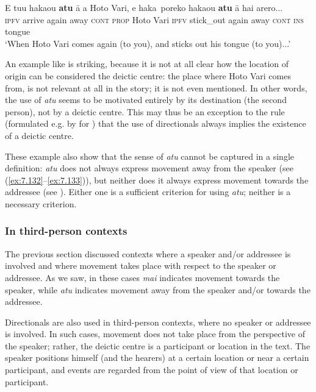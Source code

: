 \ea\label{ex:7.133}
\gll E tu{\ꞌ}u haka{\ꞌ}ou \textbf{atu} {\ꞌ}ā a Hoto Vari,  e haka~poreko haka{\ꞌ}ou \textbf{atu} {\ꞌ}ā hai {\ꞌ}arero...\\
\textsc{ipfv} arrive again away \textsc{cont} \textsc{prop} Hoto Vari  \textsc{ipfv} stick\_out again away \textsc{cont} \textsc{ins} tongue\\

\glt
‘When Hoto Vari comes again (to you), and sticks out his tongue (to you)...’ \textstyleExampleref{[R304.020]} 
\z

An example like  is striking, because it is not at all clear how the location of origin can be considered the deictic centre: the place where Hoto Vari comes from, is not relevant at all in the story; it is not even mentioned. In other words, the use of \textit{atu} seems to be motivated entirely by its destination (the second person), not by a deictic centre. This may thus be an exception to the rule (formulated e.g. by \citealt[285]{Hooper2002} for ) that the use of directionals always implies the existence of a deictic centre.

These example also show that the sense of \textit{atu} cannot be captured in a single definition: \textit{atu} does not always express movement away from the speaker (see (\ref{ex:7.132}–\ref{ex:7.133})), but neither does it always express movement towards the addressee (see ). Either one is a sufficient criterion for using \textit{atu}; neither is a necessary criterion.

\subsubsection{In third-person contexts}\label{sec:7.5.1.2}

The previous section discussed contexts where a speaker and/or addressee is involved and where movement takes place with respect to the speaker or addressee. As we saw, in these cases \textit{mai} indicates movement towards the speaker, while \textit{atu} indicates movement away from the speaker and/or towards the addressee.

Directionals are also used in third-person contexts, where no speaker or addressee is involved. In such cases, movement does not take place from the perspective of the speaker; rather, the deictic centre is a participant or location in the text. The speaker positions himself (and the hearers) at a certain location or near a certain participant, and events are regarded from the point of view of that location or participant.

